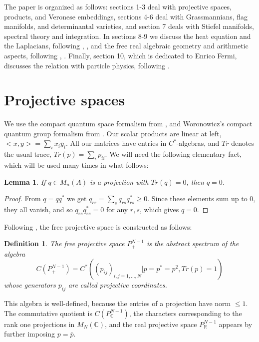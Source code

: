 \documentclass[11pt]{article}
\theoremstyle{plain}
\newtheorem{lemma}[theorem]{Lemma}
\newtheorem{definition}[theorem]{Definition}
\begin{document}
\bigskip

The paper is organized as follows: sections 1-3 deal with projective spaces, products, and Veronese embeddings, sections 4-6 deal with Grassmannians, flag manifolds, and determinantal varieties, and section 7 deals with Stiefel manifolds, spectral theory and integration. In sections 8-9 we discuss the heat equation and the Laplacians, following \cite{mfs}, \cite{dfw}, and the free real algebraic geometry and arithmetic aspects, following \cite{fba}, \cite{oba}. Finally, section 10, which is dedicated to Enrico Fermi, discusses the relation with particle physics, following \cite{bop}.

\section{Projective spaces}

We use the compact quantum space formalism from \cite{ba1}, and Woronowicz's compact quantum group formalism from \cite{wo1}. Our scalar products are linear at left, $<x,y>=\sum_ix_i\bar{y}_i$. All our matrices have entries in $C^*$-algebras, and $Tr$ denotes the usual trace, $Tr(p)=\sum_ip_{ii}$. We will need the following elementary fact, which will be used many times in what follows:

\begin{lemma}
\label{lem:trace}
If $q\in M_n(A)$ is a projection with $Tr(q)=0$, then $q=0$.
\end{lemma}

\begin{proof}
From $q=qq^*$ we get $q_{rr}=\sum_sq_{rs}q_{rs}^*\geq0$. Since these elements sum up to 0, they all vanish, and so $q_{rs}q_{rs}^*=0$ for any $r,s$, which gives $q=0$.
\end{proof}

Following \cite{ba1}, the free projective space is constructed as follows:

\begin{definition}
The free projective space $P^{N-1}_+$ is the abstract spectrum of the algebra
$$C(P^{N-1}_+)=C^*\left((p_{ij})_{i,j=1,\ldots,N}\Big|p=p^*=p^2,Tr(p)=1\right)$$
whose generators $p_{ij}$ are called projective coordinates.
\end{definition}

This algebra is well-defined, because the entries of a projection have norm $\leq1$. The commutative quotient is $C(P^{N-1}_\mathbb C)$, the characters corresponding to the rank one projections in $M_N(\mathbb C)$, and the real projective space $P^{N-1}_\mathbb R$ appears by further imposing $p=\bar{p}$.
\end{document}
